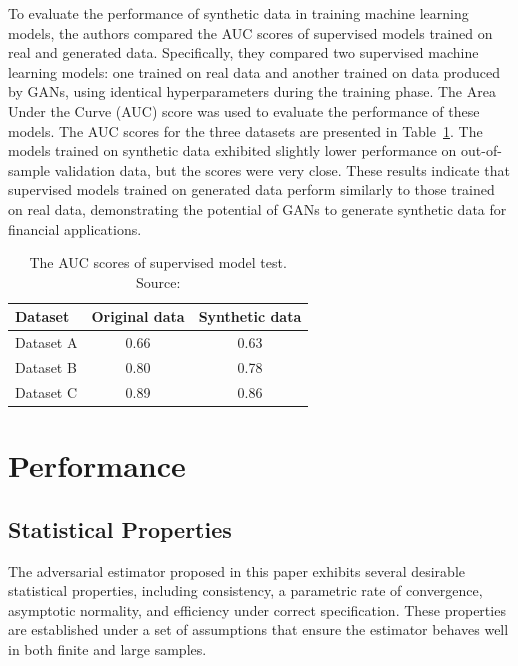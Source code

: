 \documentclass[12pt]{article}
\begin{document}
To evaluate the performance of synthetic data in training machine learning
models, the authors compared the AUC scores of supervised models trained on
real and generated data. Specifically, they compared two supervised machine
learning models: one trained on real data and another trained on data produced
by GANs, using identical hyperparameters during the training phase. The Area
Under the Curve (AUC) score was used to evaluate the performance of these
models. The AUC scores for the three datasets are presented in
Table~\ref{tab:auc_scores}. The models trained on synthetic data exhibited
slightly lower performance on out-of-sample validation data, but the scores
were very close. These results indicate that supervised models trained on
generated data perform similarly to those trained on real data, demonstrating
the potential of GANs to generate synthetic data for financial applications.

\begin{table}[h!]
    \centering
    \begin{tabular}{lcc}
        \hline Dataset   & Original data & Synthetic data \\
        \hline Dataset A & 0.66          & 0.63           \\
        Dataset B        & 0.80          & 0.78           \\
        Dataset C        & 0.89          & 0.86           \\
        \hline
    \end{tabular}
    \caption{The AUC scores of supervised model test. Source: \cite{efimovUsingGenerativeAdversarial2020}}
    \label{tab:auc_scores}
\end{table}

\section{Performance}\label{sec:performance}

\subsection{Statistical Properties} \label{subsec:statistical_properties}

The adversarial estimator proposed in this paper exhibits several desirable
statistical properties, including consistency, a parametric rate of
convergence, asymptotic normality, and efficiency under correct specification.
These properties are established under a set of assumptions that ensure the
estimator behaves well in both finite and large samples.
\end{document}
